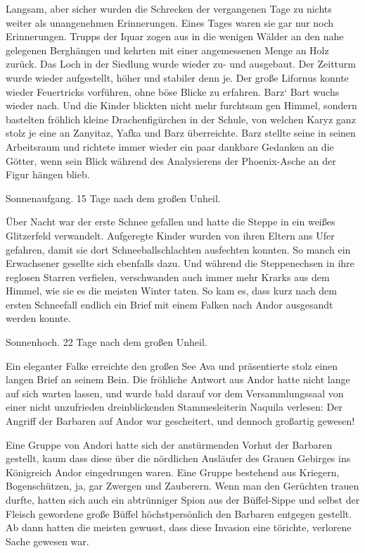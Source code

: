Langsam, aber sicher wurden die Schrecken der vergangenen Tage zu nichts weiter als unangenehmen Erinnerungen. Eines Tages waren sie gar nur noch Erinnerungen. Trupps der Iquar zogen aus in die wenigen Wälder an den nahe gelegenen Berghängen und kehrten mit einer angemessenen Menge an Holz zurück. Das Loch in der Siedlung wurde wieder zu- und ausgebaut. Der Zeitturm wurde wieder aufgestellt, höher und stabiler denn je. Der große Lifornus konnte wieder Feuertricks vorführen, ohne böse Blicke zu erfahren. Barz‘ Bart wuchs wieder nach. Und die Kinder blickten nicht mehr furchtsam gen Himmel, sondern bastelten fröhlich kleine Drachenfigürchen in der Schule, von welchen Karyz ganz stolz je eine an Zanyitaz, Yafka und Barz überreichte. Barz stellte seine in seinen Arbeitsraum und richtete immer wieder ein paar dankbare Gedanken an die Götter, wenn sein Blick während des Analysierens der Phoenix-Asche an der Figur hängen blieb.\bigskip







Sonnenaufgang. 15 Tage nach dem großen Unheil.\bigskip



Über Nacht war der erste Schnee gefallen und hatte die Steppe in ein weißes Glitzerfeld verwandelt. Aufgeregte Kinder wurden von ihren Eltern ans Ufer gefahren, damit sie dort Schneeballschlachten ausfechten konnten. So manch ein Erwachsener gesellte sich ebenfalls dazu. Und während die Steppenechsen in ihre reglosen Starren verfielen, verschwanden auch immer mehr Krarks aus dem Himmel, wie sie es die meisten Winter taten. So kam es, dass kurz nach dem ersten Schneefall endlich ein Brief mit einem Falken nach Andor ausgesandt werden konnte.\bigskip







Sonnenhoch. 22 Tage nach dem großen Unheil.\bigskip



Ein eleganter Falke erreichte den großen See Ava und präsentierte stolz einen langen Brief an seinem Bein. Die fröhliche Antwort aus Andor hatte nicht lange auf sich warten lassen, und wurde bald darauf vor dem Versammlungssaal von einer nicht unzufrieden dreinblickenden Stammesleiterin Naquila verlesen: Der Angriff der Barbaren auf Andor war gescheitert, und dennoch großartig gewesen!

Eine Gruppe von Andori hatte sich der anstürmenden Vorhut der Barbaren gestellt, kaum dass diese über die nördlichen Ausläufer des Grauen Gebirges ins Königreich Andor eingedrungen waren. Eine Gruppe bestehend aus Kriegern, Bogenschützen, ja, gar Zwergen und Zauberern. Wenn man den Gerüchten trauen durfte, hatten sich auch ein abtrünniger Spion aus der Büffel-Sippe und selbst der Fleisch gewordene große Büffel höchstpersönlich den Barbaren entgegen gestellt. Ab dann hatten die meisten gewusst, dass diese Invasion eine törichte, verlorene Sache gewesen war.


